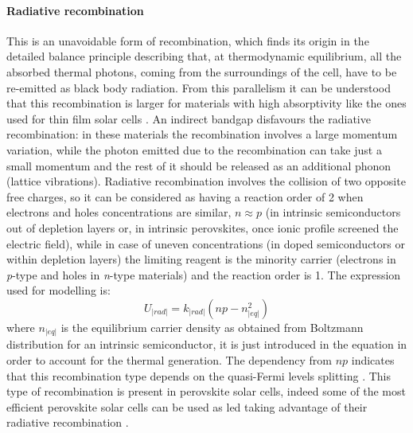 		\paragraph{Radiative recombination}
		This is an unavoidable form of recombination, which finds its origin in the detailed balance principle describing that, at thermodynamic equilibrium, all the absorbed thermal photons, coming from the surroundings of the cell, have to be re-emitted as black body radiation.
		From this parallelism it can be understood that this recombination is larger for materials with high absorptivity \cite{Nelson2003} like the ones used for thin film solar cells \cite{Tvingstedt2015}.
		An indirect bandgap disfavours the radiative recombination: in these materials the recombination involves a large momentum variation, while the photon emitted due to the recombination can take just a small momentum and the rest of it should be released as an additional phonon (lattice vibrations).
		Radiative recombination involves the collision of two opposite free charges, so it can be considered as having a reaction order of 2 when electrons and holes concentrations are similar, $n \approx p$ (in intrinsic semiconductors out of depletion layers or, in intrinsic perovskites, once ionic profile screened the electric field), while in case of uneven concentrations (in doped semiconductors or within depletion layers) the limiting reagent is the minority carrier (electrons in \textit{p}-type and holes in \textit{n}-type materials) and the reaction order is 1.
		The expression used for modelling is:
		 \begin{equation}
		U_|rad| = k_|rad| (np-n_|eq|^2)
				\end{equation}
		where $n_|eq|$ is the equilibrium carrier density as obtained from Boltzmann distribution for an intrinsic semiconductor, it is just introduced in the equation in order to account for the thermal generation.
		The dependency from $np$ indicates that this recombination type depends on the quasi\hyp{}Fermi levels splitting \cite{Stolterfoht2018a}.
		This type of recombination is present in perovskite solar cells, indeed some of the most efficient perovskite solar cells can be used as \gls{led} taking advantage of their radiative recombination \cite{Bi2016}.

